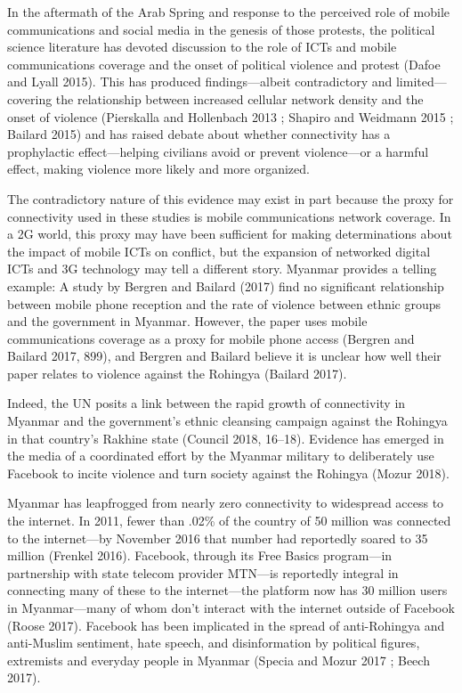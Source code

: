 In the aftermath of the Arab Spring and response to the perceived role
of mobile communications and social media in the genesis of those
protests, the political science literature has devoted discussion to the
role of ICTs and mobile communications coverage and the onset of
political violence and protest (Dafoe and Lyall 2015). This has produced
findings---albeit contradictory and limited---covering the relationship
between increased cellular network density and the onset of violence
(Pierskalla and Hollenbach 2013 ; Shapiro and Weidmann 2015 ; Bailard
2015) and has raised debate about whether connectivity has a
prophylactic effect---helping civilians avoid or prevent violence---or a
harmful effect, making violence more likely and more organized.

The contradictory nature of this evidence may exist in part because the
proxy for connectivity used in these studies is mobile communications
network coverage. In a 2G world, this proxy may have been sufficient for
making determinations about the impact of mobile ICTs on conflict, but
the expansion of networked digital ICTs and 3G technology may tell a
different story. Myanmar provides a telling example: A study by Bergren
and Bailard (2017) find no significant relationship between mobile phone
reception and the rate of violence between ethnic groups and the
government in Myanmar. However, the paper uses mobile communications
coverage as a proxy for mobile phone access (Bergren and Bailard 2017,
899), and Bergren and Bailard believe it is unclear how well their paper
relates to violence against the Rohingya (Bailard 2017).

Indeed, the UN posits a link between the rapid growth of connectivity in
Myanmar and the government's ethnic cleansing campaign against the
Rohingya in that country's Rakhine state (Council 2018, 16--18).
Evidence has emerged in the media of a coordinated effort by the Myanmar
military to deliberately use Facebook to incite violence and turn
society against the Rohingya (Mozur 2018).

Myanmar has leapfrogged from nearly zero connectivity to widespread
access to the internet. In 2011, fewer than .02\% of the country of 50
million was connected to the internet---by November 2016 that number had
reportedly soared to 35 million (Frenkel 2016). Facebook, through its
Free Basics program---in partnership with state telecom provider
MTN---is reportedly integral in connecting many of these to the
internet---the platform now has 30 million users in Myanmar---many of
whom don't interact with the internet outside of Facebook (Roose 2017).
Facebook has been implicated in the spread of anti-Rohingya and
anti-Muslim sentiment, hate speech, and disinformation by political
figures, extremists and everyday people in Myanmar (Specia and Mozur
2017 ; Beech 2017).

